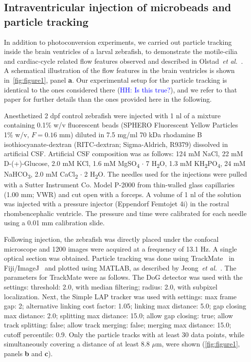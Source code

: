 \documentclass[fleqn]{wlscirep}
\newcommand{\lyng}[1]{\textcolor{blue}{#1}}
\begin{document}
\subsection*{Intraventricular injection of microbeads and particle tracking}
In addition to photoconversion experiments, we carried out particle tracking inside the brain ventricles of a larval zebrafish, to demonstrate the motile-cilia and cardiac-cycle related flow features observed and described in Olstad~\emph{et al.}~\cite{Olstad2019CiliaryDevelopment}. A schematical illustration of the flow features in the brain ventricles is shown in~\cref{fig:figure1}, panel \textbf{a}. Our experimental setup for the particle tracking is identical to the ones considered there (\lyng{HH: Is this true?}), and we refer to that paper for further details than the ones provided here in the following.

Anesthetized 2 dpf control zebrafish were injected with 1 nl of a mixture containing 0.1\% w/v fluorescent beads (SPHERO Fluorescent Yellow Particles 1\% w/v, $F = 0.16$ mm) diluted in 7.5 mg/ml 70 kDa rhodamine B isothiocyanate-dextran (RITC-dextran; Sigma-Aldrich, R9379) dissolved in artificial CSF. Artificial CSF composition was as follows: 124 mM NaCl, 22 mM D-(+)-Glucose, 2.0 mM KCl, 1.6 mM MgSO\textsubscript{4} $\cdot$ 7 H\textsubscript{2}O, 1.3 mM KH\textsubscript{2}PO\textsubscript{4}, 24 mM NaHCO\textsubscript{3}, 2.0 mM CaCl\textsubscript{2} $\cdot$ 2 H\textsubscript{2}O. The needles used for the injections were pulled with a Sutter Instrument Co. Model P-2000 from thin-walled glass capillaries (1.00 mm; VWR) and cut open with a forceps. A volume of 1 nl of the solution was injected with a pressure injector (Eppendorf Femtojet 4i) in the rostral rhombencephalic ventricle. The pressure and time were calibrated for each needle using a 0.01 mm calibration slide.

Following injection, the zebrafish was directly placed under the confocal microscope and 1200 images were acquired at a frequency of 13.1 Hz. A single optical section was obtained. Particle tracking was done using TrackMate~\cite{Tinevez2017TrackMate:Tracking} in Fiji/ImageJ~\cite{Schindelin2012Fiji:Analysis} and plotted using MATLAB, as described by Jeong~\emph{et al.}~\cite{Jeong2022MeasurementTelencephalon}. The parameters for TrackMate were as follows. The DoG detector was used with the settings: threshold: 2.0, with median filtering; radius: 2.0, with subpixel localization. Next, the Simple LAP tracker was used with settings: max frame gap: 2; alternative linking cost factor: 1.05; linking max distance: 5.0; gap closing max distance: 2.0; splitting max distance: 15.0; allow gap closing: true; allow track splitting: false; allow track merging: false; merging max distance: 15.0; cutoff percentile: 0.9. Only the particle tracks with at least 30 data points, while simultaneously covering a distance of at least 8.8 $\mu$m, were shown (\cref{fig:figure1}, panels \textbf{b} and \textbf{c}).
\end{document}
